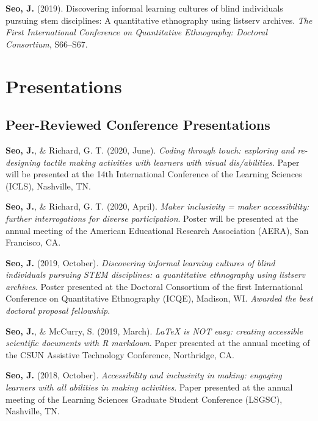 \documentclass[11pt, a4paper]{awesome-cv}
\begin{document}
\leavevmode\hypertarget{ref-seo2019discovering}{}%
\textbf{Seo, J.} (2019). Discovering informal learning cultures of blind individuals pursuing stem disciplines: A quantitative ethnography using listserv archives. \emph{The First International Conference on Quantitative Ethnography: Doctoral Consortium}, S66--S67.

\endgroup

\hypertarget{presentations}{%
\section{Presentations}\label{presentations}}

\hypertarget{peer-reviewed-conference-presentations}{%
\subsection{Peer-Reviewed Conference Presentations}\label{peer-reviewed-conference-presentations}}

\begingroup
\setlength{\parindent}{-0.5in}
\setlength{\leftskip}{0.5in}

\textbf{Seo, J.}, \& Richard, G. T. (2020, June). \emph{Coding through touch: exploring and re-designing tactile making activities with learners with visual dis/abilities}. Paper will be presented at the 14th International Conference of the Learning Sciences (ICLS), Nashville, TN.

\textbf{Seo, J.}, \& Richard, G. T. (2020, April). \emph{Maker inclusivity = maker accessibility: further interrogations for diverse participation}. Poster will be presented at the annual meeting of the American Educational Research Association (AERA), San Francisco, CA.

\textbf{Seo, J.} (2019, October). \emph{Discovering informal learning cultures of blind individuals pursuing STEM disciplines: a quantitative ethnography using listserv archives}. Poster presented at the Doctoral Consortium of the first International Conference on Quantitative Ethnography (ICQE), Madison, WI. \emph{Awarded the best doctoral proposal fellowship}.

\textbf{Seo, J.}, \& McCurry, S. (2019, March). \emph{LaTeX is NOT easy: creating accessible scientific documents with R markdown}. Paper presented at the annual meeting of the CSUN Assistive Technology Conference, Northridge, CA.

\textbf{Seo, J.} (2018, October). \emph{Accessibility and inclusivity in making: engaging learners with all abilities in making activities}. Paper presented at the annual meeting of the Learning Sciences Graduate Student Conference (LSGSC), Nashville, TN.
\end{document}
